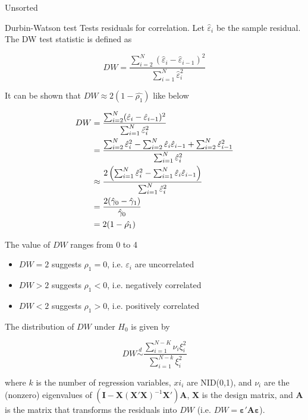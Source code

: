 \documentclass{article}
\newcommand{\mat}[1]{\mathbf{#1}}
\newcommand{\eh}{\hat{\varepsilon}}
\begin{document}
\begin{section}{Unsorted}
\begin{subsection}{Durbin-Watson test}
Tests residuals for correlation. Let $\eh_i$ be the sample residual. The DW
test statistic is defined as

\[ DW = \frac{\sum_{i=2}^N (\eh_i - \eh_{i-1})^2}{\sum_{i=1}^N \eh_i^2} \]

\noindent It can be shown that $DW \approx 2 (1 - \hat{\rho_1})$ like below

\begin{align}
DW &= \frac{\sum_{i=2}^N (\eh_i - \eh_{i-1})^2}{\sum_{i=1}^N \eh_i^2} \notag\\
   &= \frac{\sum_{i=2}^N \eh_i^2 - \sum_{i=2}^N \eh_i \eh_{i-1} + 
       \sum_{i=2}^N \eh_{i-1}^2}{\sum_{i=1}^N \eh_i^2} \notag\\
   &\approx \frac{2 \left(\sum_{i=1}^N \eh_i^2 - \sum_{i=1}^N \eh_i \eh_{i-1} 
     \right)}{\sum_{i=1}^N \eh_i^2} \notag\\
   &= \frac{2 (\hat{\gamma}_0 - \hat{\gamma}_1)}{\hat{\gamma}_0} \notag\\
   &= 2 (1 - \hat{\rho_1}) \notag
\end{align}

\noindent The value of $DW$ ranges from 0 to 4

\begin{itemize}
\item $DW = 2$ suggests $\rho_1 = 0$, i.e. $\varepsilon_i$ are uncorrelated
\item $DW > 2$ suggests $\rho_1 < 0$, i.e. negatively correlated
\item $DW < 2$ suggests $\rho_1 > 0$, i.e. positively correlated
\end{itemize}

\noindent The distribution of $DW$ under $H_0$ is given by

\[ DW \overset{d}\sim \frac{\sum_{i=1}^{N-K} \nu_i \xi_i^2}{
    \sum_{i=1}^{N-k} \xi_i^2} \]

\noindent where $k$ is the number of regression variables, $xi_i$ are
NID(0,1), and $\nu_i$ are the (nonzero) eigenvalues of
$(\mat{I} - \mat{X}(\mat{X}'\mat{X})^{-1}\mat{X}')\mat{A}$, 
$\mat{X}$ is the design matrix, and $\mat{A}$ is the matrix that transforms
the residuals into $DW$ (i.e. $DW = \mat{\varepsilon}'\mat{A}\mat{\varepsilon}$).

\end{subsection}
\end{section}
\end{document}
